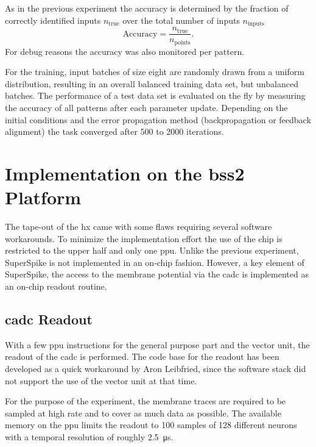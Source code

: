 As in the previous experiment the accuracy is determined by the fraction of correctly identified inputs $n_\text{true}$ over the total number of inputs $n_\text{inputs}$
\begin{equation}
\text{Accuracy} = \frac{n_\text{true}}{n_\text{points}}.
\end{equation}
For debug reasons the accuracy was also monitored per pattern.

For the training, input batches of size eight are randomly drawn from a uniform distribution, resulting in an overall balanced training data set, but unbalanced batches. The performance of a test data set is evaluated on the fly by measuring the accuracy of all patterns after each parameter update. Depending on the initial conditions and the error propagation method (backpropagation or feedback alignment) the task converged after 500 to 2000 iterations.

\section{Implementation on the \acrshort{bss2} Platform}
The tape-out of the \gls{hx} came with some flaws requiring several software workarounds. To minimize the implementation effort the use of the chip is restricted to the upper half and only one \gls{ppu}. Unlike the previous experiment, SuperSpike is not implemented in an on-chip fashion. However, a key element of SuperSpike, the access to the membrane potential via the \gls{cadc} is implemented as an on-chip readout routine.

\subsection{\gls{cadc} Readout}
With a few \gls{ppu} instructions for the general purpose part and the vector unit, the readout of the \gls{cadc} is performed. The code base for the readout has been developed as a quick workaround by Aron Leibfried, since the software stack did not support the use of the vector unit at that time.

For the purpose of the experiment, the membrane traces are required to be sampled at high rate and to cover as much data as possible. The available memory on the \gls{ppu} limits the readout to 100 samples of 128 different neurons with a temporal resolution of roughly \SI{2.5}{\micro \s}. 

